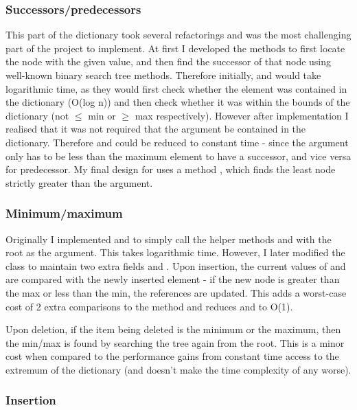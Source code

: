 \subsubsection{Successors/predecessors}
This part of the dictionary took several refactorings and was the most challenging part of the project to implement. At first I developed the methods to first locate the node with the given value, and then find the successor of that node using well-known binary search tree methods. Therefore initially,  and  would take logarithmic time, as they would first check whether the element was contained in the dictionary (O(log n)) and then check whether it was within the bounds of the dictionary (not $\leq$ min or $\geq$ max respectively). However after implementation I realised that it was not required that the argument be contained in the dictionary. Therefore  and  could be reduced to constant time - since the argument only has to be less than the maximum element to have a successor, and vice versa for predecessor. My final design for  uses a method , which finds the least node strictly greater than the argument.

\subsubsection{Minimum/maximum}
Originally I implemented  and  to simply call the helper methods  and  with the root as the argument. This takes logarithmic time. However, I later modified the class to maintain two extra fields  and . Upon insertion, the current values of  and  are compared with the newly inserted element - if the new node is greater than the max or less than the min, the references are updated. This adds a worst-case cost of 2  extra comparisons to the  method and reduces  and  to O(1).

Upon deletion, if the item being deleted is the minimum or the maximum, then the min/max is found by searching the tree again from the root. This is a minor cost when compared to the performance gains from constant time access to the extremum of the dictionary (and doesn't make the time complexity of  any worse).

\subsubsection{Insertion} 


